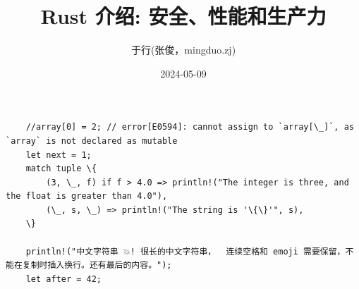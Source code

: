 \documentclass[lang=cn,11pt,a4paper,table,fontset=none]{ctexart}
\author{于行(张俊，mingduo.zj)}
\date{2024-05-09}
\title{Rust 介绍: 安全、性能和生产力}
\begin{document}
\begin{minipage}{250pt}
\begin{Code}
\begin{Verbatim}
    //array[0] = 2; // error[E0594]: cannot assign to `array[\_]`, as `array` is not declared as mutable
    let next = 1;
    match tuple \{
        (3, \_, f) if f > 4.0 => println!("The integer is three, and the float is greater than 4.0"),
        (\_, s, \_) => println!("The string is '\{\}'", s),
    \}

    println!("中文字符串 💥! 很长的中文字符串，  连续空格和 emoji 需要保留，不能在复制时插入换行。还有最后的内容。");
    let after = 42;
\end{Verbatim}
\end{Code}
\end{minipage}
\end{document}
